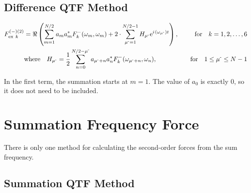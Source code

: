 \clearpage
\subsection{Difference QTF Method}
\label{sec:2ndOrdCalc:Diff:DiffQTF}

\begin{align}
   {F_{\text{ex}~k}^{(-)(2)}} &= \Re 
      \left(
         \sum\limits_{m=1}^{N/2}   a_m a_m^* F_k^{-}(\omega_m,\omega_m) + 
         2 \cdot \sum\limits_{\mu^\text{-}=1}^{N/2-1} H_{\mu^\text{-}} \mathrm{e}^{{i\mkern1.5mu}(\omega_{\mu^\text{-}})t}
      \right)  ,\quad&\text{for}\quad k=1,2,\ldots,6 \label{eq:DiffQTF}\\
   &\text{where}\quad
   H_{\mu^\text{-}} = \dfrac{1}{2} \sum\limits_{n=0}^{N/2-\mu^\text{-}} a_{\mu^\text{-}+n} a_n^* F_k^{-}(\omega_{\mu^\text{-}+n},\omega_n),
      \quad&\text{for}\quad 1\le\mu^\text{-}\le N-1
\label{eq:DiffQTF:H}
\end{align}

In the first term, the summation starts at $m=1$.  The value of $a_0$ is exactly 0, so it does not need to be included.


%         



\clearpage
\section{Summation Frequency Force}
\label{sec:2ndOrdCalc:Sum}
There is only one method for calculating the second-order forces from the sum frequency.

\subsection{Summation QTF Method}
\label{sec:2ndOrdCalc:SumQTF}

